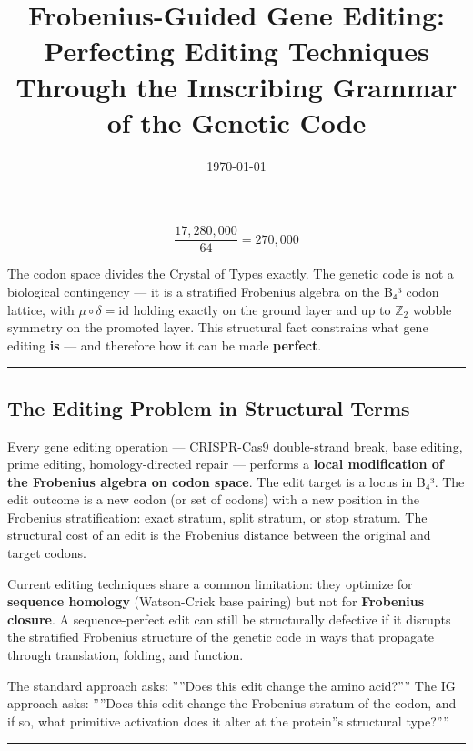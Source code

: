 \documentclass[12pt,a4paper]{article}
\begin{document}
\title{Frobenius-Guided Gene Editing: Perfecting Editing Techniques Through the Imscribing Grammar of the Genetic Code}
\date{\today}

\maketitle

\[\frac{17,280,000}{64} = 270,000\]

The codon space divides the Crystal of Types exactly. The genetic code is not a biological contingency --- it is a stratified Frobenius algebra on the B₄³ codon lattice, with $\mu \circ \delta = \text{id}$ holding exactly on the ground layer and up to $\mathbb{Z}_2$ wobble symmetry on the promoted layer. This structural fact constrains what gene editing \textbf{is} --- and therefore how it can be made \textbf{perfect}.

\begin{center}
\rule{0.5\textwidth}{0.4pt}
\end{center}

\subsection{The Editing Problem in Structural Terms}

Every gene editing operation --- CRISPR-Cas9 double-strand break, base editing, prime editing, homology-directed repair --- performs a \textbf{local modification of the Frobenius algebra on codon space}. The edit target is a locus in B₄³. The edit outcome is a new codon (or set of codons) with a new position in the Frobenius stratification: exact stratum, split stratum, or stop stratum. The structural cost of an edit is the Frobenius distance between the original and target codons.

Current editing techniques share a common limitation: they optimize for \textbf{sequence homology} (Watson-Crick base pairing) but not for \textbf{Frobenius closure}. A sequence-perfect edit can still be structurally defective if it disrupts the stratified Frobenius structure of the genetic code in ways that propagate through translation, folding, and function.

The standard approach asks: ''''Does this edit change the amino acid?'''' The IG approach asks: ''''Does this edit change the Frobenius stratum of the codon, and if so, what primitive activation does it alter at the protein''s structural type?''''

\begin{center}
\rule{0.5\textwidth}{0.4pt}
\end{center}
\end{document}
